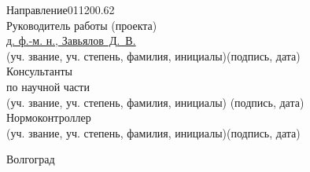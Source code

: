 \begin{titlepage}
\begin{flushleft}
		Направление\hspace{1cm}011200.62\\
		Руководитель работы (проекта)\\
		\underline{д. ф.-м. н., Завьялов~Д.~В.}\hfill\underline{\hspace{5cm}}\\
		\vspace{-.2cm}\hspace{.4cm}\footnotesize(уч. звание, уч. степень, 
			фамилия, инициалы)\hspace{6.5cm}(подпись, дата)\normalsize\\
		Консультанты\\
		по научной части \underline{\hspace{7cm}}\hfill%
			\underline{\hspace{5cm}}\\\vspace{-.2cm}\hspace{4cm}%
			\footnotesize(уч. звание, уч. степень, фамилия, инициалы)%
			\hspace{3cm}(подпись, дата)\normalsize\\
		Нормоконтроллер \underline{\hspace{7cm}}
			\hfill\underline{\hspace{5cm}}\\
		\vspace{-.2cm}\hspace{4cm}\footnotesize(уч. звание, уч. степень, 
			фамилия, инициалы)\hspace{3cm}(подпись, дата)\normalsize\\
	\end{flushleft}

	\vspace{\fill}

	\begin{center}
		Волгоград \the\year
	\end{center}
\end{titlepage}

